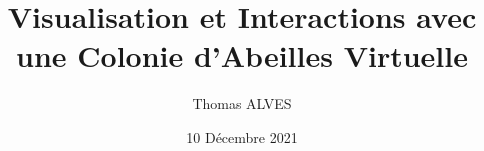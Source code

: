 





\author{Thomas ALVES}

\title{Visualisation et Interactions avec une Colonie d'Abeilles Virtuelle}

\date{10 Décembre 2021}



